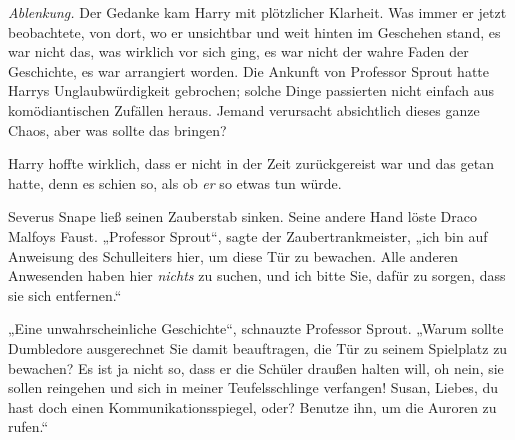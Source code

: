 \emph{Ablenkung.}
Der Gedanke kam Harry mit plötzlicher Klarheit. Was immer er jetzt beobachtete, von dort, wo er unsichtbar und weit hinten im Geschehen stand, es war nicht das, was wirklich vor sich ging, es war nicht der wahre Faden der Geschichte, es war arrangiert worden. Die Ankunft von Professor Sprout hatte Harrys Unglaubwürdigkeit gebrochen; solche Dinge passierten nicht einfach aus komödiantischen Zufällen heraus. Jemand verursacht absichtlich dieses ganze Chaos, aber was sollte das bringen?

Harry hoffte wirklich, dass er nicht in der Zeit zurückgereist war und das getan hatte, denn es schien so, als ob \emph{er} so etwas tun würde.

Severus Snape ließ seinen Zauberstab sinken. Seine andere Hand löste Draco Malfoys Faust.
„Professor Sprout“, sagte der Zaubertrankmeister, „ich bin auf Anweisung des Schulleiters hier, um diese Tür zu bewachen. Alle anderen Anwesenden haben hier \emph{nichts} zu suchen, und ich bitte Sie, dafür zu sorgen, dass sie sich entfernen.“

„Eine unwahrscheinliche Geschichte“, schnauzte Professor Sprout.
„Warum sollte Dumbledore ausgerechnet Sie damit beauftragen, die Tür zu seinem Spielplatz zu bewachen? Es ist ja nicht so, dass er die Schüler draußen halten will, oh nein, sie sollen reingehen und sich in meiner Teufelsschlinge verfangen! Susan, Liebes, du hast doch einen Kommunikationsspiegel, oder? Benutze ihn, um die Auroren zu rufen.“

